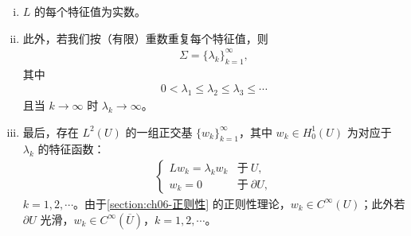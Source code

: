 \documentclass[../../main.tex]{subfiles}
\begin{document}
\begin{theorem}[对称椭圆算子的特征值]\label{theorem:ch06-对称算子特征值}
\begin{enumerate}[(i)]
\item $L$ 的每个特征值为实数。
\item 此外，若我们按（有限）重数重复每个特征值，则
\begin{align*}
\Sigma=\{\lambda_{k}\}_{k=1}^{\infty},
\end{align*}
其中
\begin{align*}
0<\lambda_{1}\leqslant\lambda_{2}\leqslant\lambda_{3}\leqslant\cdots
\end{align*}
且当 $k\to\infty$ 时 $\lambda_{k}\to\infty$。
\item 最后，存在 $L^{2}(U)$ 的一组正交基 $\{w_{k}\}_{k=1}^{\infty}$，其中 $w_{k}\in H^{1}_{0}(U)$ 为对应于 $\lambda_{k}$ 的特征函数：
\begin{align}
\begin{cases}
Lw_{k}=\lambda_{k}w_{k} & \text{于}\ U,\\
w_{k}=0 & \text{于}\ \partial U,
\end{cases}
\end{align}
$k=1,2,\cdots$。由于\cref{section:ch06-正则性} 的正则性理论，$w_{k}\in C^{\infty}(U)$；此外若 $\partial U$ 光滑，$w_{k}\in C^{\infty}(\overline{U})$，$k=1,2,\cdots$。
\end{enumerate}
\end{theorem}
\end{document}

